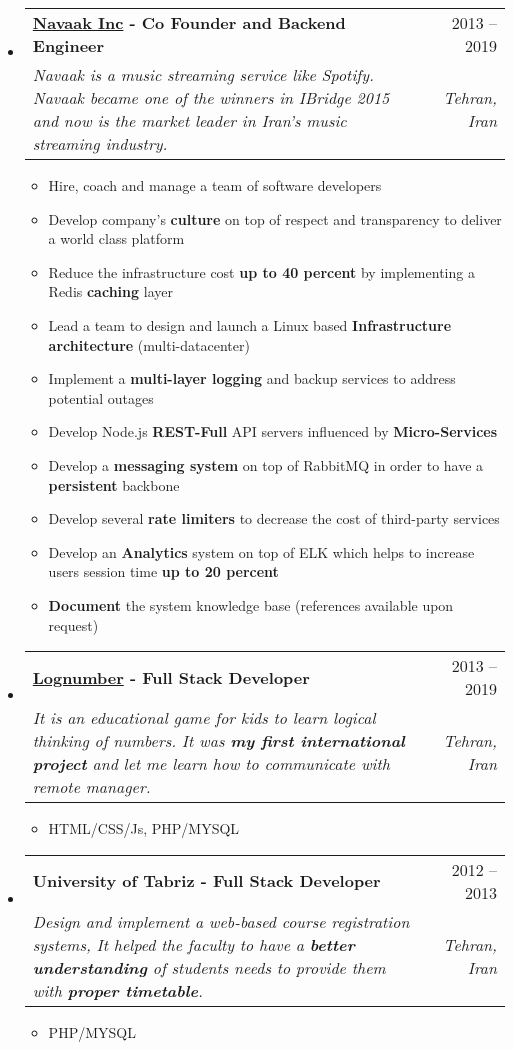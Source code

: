 \documentclass[a4paper,12pt]{article}[leftmargin=*]
\makeatletter
\def \entryspacing {-0pt}
\newcommand{\resumeEntryStart}{\begin{itemize}[leftmargin=2.5mm]}
\newcommand{\resumeEntryEnd}{\end{itemize}\vspace{\entryspacing}}
\newcommand{\resumeItemListStart}{\begin{itemize}[leftmargin=4.5mm]}
\newcommand{\resumeItemListEnd}{\end{itemize}}
\newcommand{\resumeItem}[1]{
  \item\small{
    {#1 \vspace{-2pt}}
  }
}
\newcommand{\resumeEntryTSDL}[4]{
  \vspace{-1pt}\item[]
    \begin{tabularx}{0.99\textwidth}{X@{\hspace{60pt}}r}
      \textbf{\color{primary}#1} & {\firabook\color{accent}\small#2} \\
      \textit{\color{accent}\small#3} & \textit{\color{accent}\small#4} \\
    \end{tabularx}\vspace{-7pt}
}
\makeatother
\begin{document}
  \vspace{-15pt}
  \resumeEntryStart
    \resumeEntryTSDL
      {\href{https://www.linkedin.com/company/navaak/about/}{Navaak Inc} - Co Founder and Backend Engineer}{2013 -- 2019}
      {Navaak is a music streaming service like Spotify. Navaak became one of the winners in IBridge 2015 and now is the market leader in Iran’s music streaming industry.}{Tehran, Iran}
    \resumeItemListStart
      \resumeItem {Hire, coach and manage a team of software developers}
      \resumeItem {Develop company's  \textbf{culture} on top of respect and transparency to deliver a world class platform}
      \resumeItem {Reduce the infrastructure cost \textbf{up to 40 percent} by implementing a Redis \textbf{caching} layer}
      \resumeItem {Lead a team to design and launch a Linux based \textbf{Infrastructure architecture} (multi-datacenter)}
      \resumeItem {Implement a \textbf{multi-layer logging} and backup services to address potential outages}
      \resumeItem {Develop Node.js \textbf{REST-Full} API servers influenced by \textbf{Micro-Services}}
      \resumeItem {Develop a \textbf{messaging system} on top of RabbitMQ in order to have a \textbf{persistent} backbone}
      \resumeItem {Develop several \textbf{rate limiters} to decrease the cost of third-party services}
      \resumeItem {Develop an \textbf{Analytics} system on top of ELK which helps to increase users session time \textbf{up to 20 percent}}
      \resumeItem {\textbf{Document} the system knowledge base (references available upon request)}
    \resumeItemListEnd
  \resumeEntryEnd

  \vspace{-15pt}
  \resumeEntryStart
    \resumeEntryTSDL
      {\href{https://www.lognumber.com}{Lognumber} - Full Stack Developer}{2013 -- 2019}
      {It is an educational game for kids to learn logical thinking of numbers. It was \textbf{my first international project} and let me learn how to communicate with remote manager.}{Tehran, Iran}
    \resumeItemListStart
        \resumeItem {HTML/CSS/Js, PHP/MYSQL}
    \resumeItemListEnd
  \resumeEntryEnd
  
  \vspace{-14pt}
  \resumeEntryStart
    \resumeEntryTSDL
      {University of Tabriz - Full Stack Developer}{2012 -- 2013}
      {Design and implement a web-based course registration systems, It helped the faculty to have a \textbf{better understanding} of students needs to provide them with \textbf{proper timetable}.}{Tehran, Iran}
    \resumeItemListStart
        \resumeItem {PHP/MYSQL}
    \resumeItemListEnd
  \resumeEntryEnd
\end{document}

